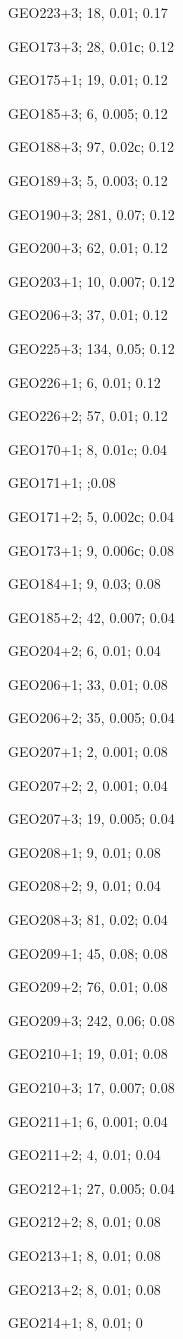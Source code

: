 GEO223+3; 18, 0.01; 0.17

GEO173+3; 28, 0.01с; 0.12

GEO175+1; 19, 0.01; 0.12

GEO185+3; 6, 0.005; 0.12

GEO188+3; 97, 0.02с; 0.12

GEO189+3; 5, 0.003; 0.12

GEO190+3; 281, 0.07; 0.12

GEO200+3; 62, 0.01; 0.12

GEO203+1; 10, 0.007; 0.12

GEO206+3; 37, 0.01; 0.12

GEO225+3; 134, 0.05; 0.12

GEO226+1; 6, 0.01; 0.12

GEO226+2; 57, 0.01; 0.12

GEO170+1; 8, 0.01c; 0.04

GEO171+1; ;0.08

GEO171+2; 5, 0.002с; 0.04

GEO173+1; 9, 0.006с; 0.08

GEO184+1; 9, 0.03; 0.08

GEO185+2; 42, 0.007; 0.04

GEO204+2; 6, 0.01; 0.04

GEO206+1; 33, 0.01; 0.08

GEO206+2; 35, 0.005; 0.04

GEO207+1; 2, 0.001; 0.08

GEO207+2; 2, 0.001; 0.04

GEO207+3; 19, 0.005; 0.04

GEO208+1; 9, 0.01; 0.08

GEO208+2; 9, 0.01; 0.04

GEO208+3; 81, 0.02; 0.04

GEO209+1; 45, 0.08; 0.08

GEO209+2; 76, 0.01; 0.08

GEO209+3; 242, 0.06; 0.08

GEO210+1; 19, 0.01; 0.08

GEO210+3; 17, 0.007; 0.08

GEO211+1; 6, 0.001; 0.04

GEO211+2; 4, 0.01; 0.04

GEO212+1; 27, 0.005; 0.04

GEO212+2; 8, 0.01; 0.08

GEO213+1; 8, 0.01; 0.08

GEO213+2; 8, 0.01; 0.08

GEO214+1; 8, 0.01; 0

